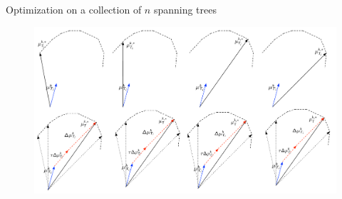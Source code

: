 \documentclass[first=dgreen,second=purple,logo=yellowexc]{aaltoslides}
\begin{document}
\begin{frame}{Optimization on a collection of $n$ spanning trees}
	\begin{figure}
		\begin{center}
			\includegraphics[scale=0.3]{best_update.pdf}
		\end{center}
	\end{figure}
\end{frame}
\end{document}
